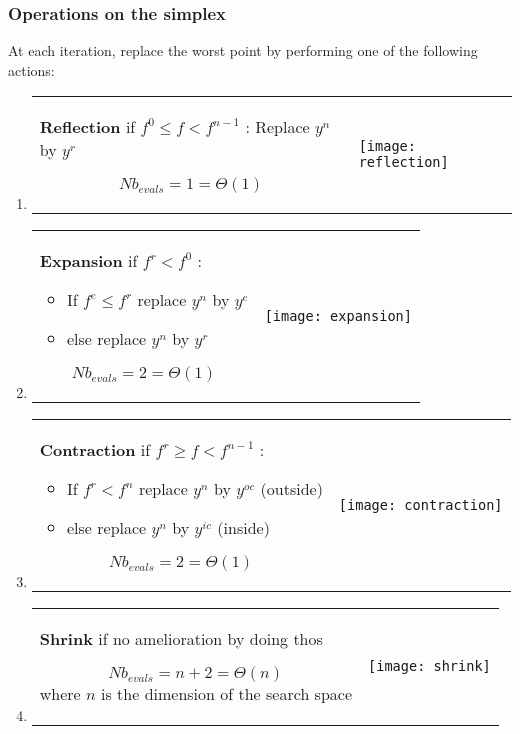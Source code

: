\subsubsection{Operations on the simplex}
At each iteration, replace the worst point by performing one of the
following actions:
\begin{enumerate}
    \item \begin{tabular}{m{9cm}m{3cm}}
            \textbf{Reflection} if $f^0 \leq f < f^{n-1}$ : Replace $y^n$ by $y^r$

            $$Nb_{evals} = 1 = \Theta(1)$$
            & 
            \texttt{[image: reflection]}
        \end{tabular}

    \item \begin{tabular}{m{9cm}m{3cm}}
            \textbf{Expansion} if $f^r < f^0$ : 
            \begin{itemize}
                \item If $f^e \leq f^r$ replace $y^n$ by $y^e$
                \item else replace $y^n$ by $y^r$
            \end{itemize}

            $$Nb_{evals} = 2 = \Theta(1)$$
            & 
            \texttt{[image: expansion]}
        \end{tabular}

    \item \begin{tabular}{m{9cm}m{3cm}}
            \textbf{Contraction} if $f^r \geq f < f^{n-1}$ : 
            \begin{itemize}
                \item If $f^r < f^n$ replace $y^n$ by $y^{oc}$ (outside)
                \item else replace $y^n$ by $y^{ic}$ (inside)
            \end{itemize}

            $$Nb_{evals} = 2 = \Theta(1)$$
            & 
            \texttt{[image: contraction]}
        \end{tabular}

    \item \begin{tabular}{m{9cm}m{3cm}}
            \textbf{Shrink} if no amelioration by doing thos 

            $$Nb_{evals} = n+2 = \Theta(n)$$ where $n$ is the dimension
            of the search space
            & 
            \texttt{[image: shrink]}
        \end{tabular}
\end{enumerate}


